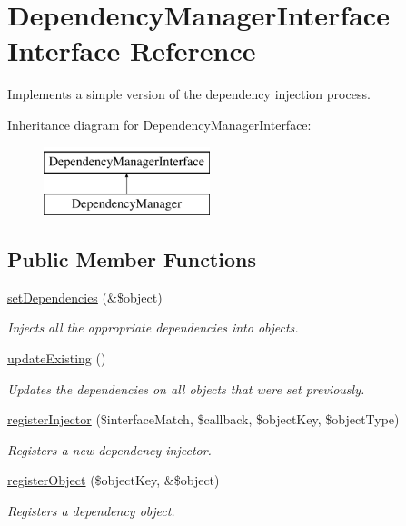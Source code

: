 \hypertarget{interfaceDependencyManagerInterface}{\section{Dependency\-Manager\-Interface Interface Reference}
\label{interfaceDependencyManagerInterface}
}


Implements a simple version of the dependency injection process.  


Inheritance diagram for Dependency\-Manager\-Interface\-:\begin{figure}[H]
\begin{center}
\leavevmode
\includegraphics[height=2.000000cm]{interfaceDependencyManagerInterface}
\end{center}
\end{figure}
\subsection*{Public Member Functions}
\begin{DoxyCompactItemize}
\item 
\hyperlink{interfaceDependencyManagerInterface_aeff0122054e837d487325eb6d03c5631}{set\-Dependencies} (\&\$object)
\begin{DoxyCompactList}\small\item\em Injects all the appropriate dependencies into objects. \end{DoxyCompactList}\item 
\hyperlink{interfaceDependencyManagerInterface_ae933f368556537a5d543ffcf367cc3db}{update\-Existing} ()
\begin{DoxyCompactList}\small\item\em Updates the dependencies on all objects that were set previously. \end{DoxyCompactList}\item 
\hyperlink{interfaceDependencyManagerInterface_a004b87c671ceef9a96a3b644791ebbf7}{register\-Injector} (\$interface\-Match, \$callback, \$object\-Key, \$object\-Type)
\begin{DoxyCompactList}\small\item\em Registers a new dependency injector. \end{DoxyCompactList}\item 
\hyperlink{interfaceDependencyManagerInterface_a7cbf2766f05c6e2ba6bcae7a80d9e7ad}{register\-Object} (\$object\-Key, \&\$object)
\begin{DoxyCompactList}\small\item\em Registers a dependency object. \end{DoxyCompactList}\end{DoxyCompactItemize}


